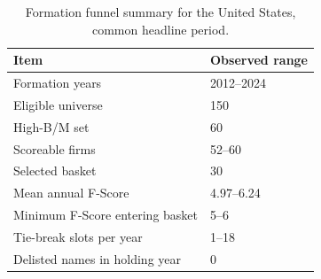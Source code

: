 \documentclass[11pt,a4paper]{report}
\numberwithin{figure}{chapter}
\numberwithin{table}{chapter}
\numberwithin{equation}{chapter}
\begin{document}
\begin{table}[H]
\centering
\scriptsize
\caption{Formation funnel summary for the United States, common headline period.}
\label{tab:us_funnel}
\begin{tabularx}{0.72\textwidth}{p{} X}
\hline
\textbf{Item} & \textbf{Observed range} \\
\hline
Formation years & 2012--2024 \\
Eligible universe & 150 \\
High-B/M set & 60 \\
Scoreable firms & 52--60 \\
Selected basket & 30 \\
Mean annual F-Score & 4.97--6.24 \\
Minimum F-Score entering basket & 5--6 \\
Tie-break slots per year & 1--18 \\
Delisted names in holding year & 0 \\
\hline
\end{tabularx}
\end{table}
\end{document}
